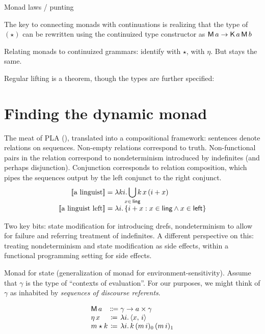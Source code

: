 	Monad laws / punting
	\begin{defi}
	\end{defi}
	
	The key to connecting monads with continuations is realizing that the type of $(\star)$ can be rewritten using the continuized type constructor as $\textsf{M}\,a \rightarrow \textsf{K}\,a\,\textsf{M}\,b$%

	Relating monads to continuized grammars: identify  with $\star$,  with $\eta$. But  stays the same.%
	
	Regular lifting is a theorem, though the types are further specified:
	\begin{fact}
		
	\end{fact}

\section{Finding the dynamic monad}
	The meat of PLA (\citealt{Dekker:1994}), translated into a compositional framework: sentences denote relations on sequences. Non-empty relations correspond to truth. Non-functional pairs in the relation correspond to nondeterminism introduced by indefinites (and perhaps disjunction). Conjunction corresponds to relation composition, which pipes the sequences output by the left conjunct to the right conjunct.%
	\[\begin{array}{r@{}l}
		\sv{\text{a linguist}} &{}= \lambda ki.\displaystyle\bigcup_{\mathclap{x\in\,\textsf{ling}}}k\,x\,(i + x)%
		\\
		\sv{\text{a linguist left}} &{}= \lambda i.\,\{i + x : x \in \textsf{ling} \wedge x \in \textsf{left}\}%
	\end{array}\]%

	Two key bits: state modification for introducing drefs, nondeterminism to allow for failure and referring treatment of indefinites. A different perspective on this: treating nondeterminism and state modification as side effects, within a functional programming setting for side effects. %
	
	Monad for state (generalization of monad for environment-sensitivity). Assume that $\gamma$ is the type of ``contexts of evaluation''. For our purposes, we might think of $\gamma$ as inhabited by \emph{sequences of discourse referents}.%
	\begin{defi}\label{state}
		\[\begin{array}[t]
			{@{}l@{}c@{}l@{}}
			\textsf{M}\,a &{}\Coloneqq{} &\gamma \ra a \times \gamma	%
			\\
			\eta\,x &{}\ceq{} &\lambda i.\,\ab{x,\,i}
			\\
			m \star k &{}\ceq{} &\lambda i.\,k\,(m\,i)_0\,(m\,i)_1%
		\end{array}\]
	\end{defi}
	
